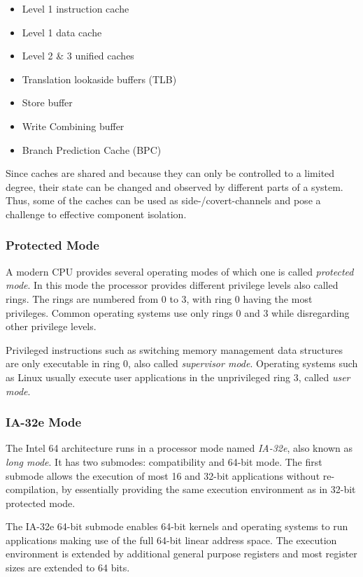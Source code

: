 \begin{itemize}
	\item Level 1 instruction cache
	\item Level 1 data cache
	\item Level 2 \& 3 unified caches
	\item Translation lookaside buffers (TLB)
	\item Store buffer
	\item Write Combining buffer
	\item Branch Prediction Cache (BPC)
\end{itemize}

Since caches are shared and because they can only be controlled to a limited
degree, their state can be changed and observed by different parts of a system.
Thus, some of the caches can be used as side-/covert-channels
and pose a challenge to effective component isolation.

\subsubsection{Protected Mode}
A modern CPU provides several operating modes of which one is called
\emph{protected mode}. In this mode the processor
provides different privilege levels also called rings. The rings
are numbered from 0 to 3, with ring 0 having the most privileges. Common
operating systems use only rings 0 and 3 while disregarding other privilege
levels.

Privileged instructions such as switching memory management data structures are
only executable in ring 0, also called \emph{supervisor mode}. Operating systems such as Linux usually execute user applications in the
unprivileged ring 3, called \emph{user mode}.

\subsubsection{IA-32e Mode}
The Intel 64 architecture runs in a processor mode named
\emph{IA-32e}, also known as \emph{long mode}.
It has two submodes: compatibility and 64-bit mode.  The first submode allows
the execution of most 16 and 32-bit applications without re-compilation, by
essentially providing the same execution environment as in 32-bit protected
mode.

The IA-32e 64-bit submode enables 64-bit kernels and operating systems to run
applications making use of the full 64-bit linear address space. The execution
environment is extended by additional general purpose registers and most
register sizes are extended to 64 bits.

